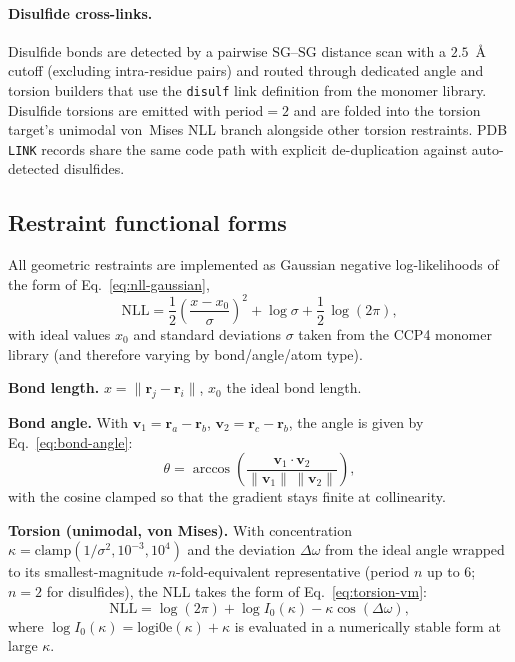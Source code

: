 \documentclass{iucrjournals}
\begin{document}
\paragraph{Disulfide cross-links.}
Disulfide bonds are detected by a pairwise $\mathrm{SG}\text{--}\mathrm{SG}$
distance scan with a $2.5$~\AA{} cutoff (excluding intra-residue pairs)
and routed through dedicated angle and torsion builders that use the
\texttt{disulf} link definition from the monomer library.  Disulfide
torsions are emitted with $\mathrm{period} = 2$ and are folded into the
torsion target's unimodal von~Mises NLL branch alongside other torsion
restraints.  PDB \texttt{LINK} records share the same code path with
explicit de-duplication against auto-detected disulfides.

\subsection{Restraint functional forms}

All geometric restraints are implemented as Gaussian negative log-likelihoods of
the form of Eq.~\ref{eq:nll-gaussian},
%
\begin{equation}
  \mathrm{NLL} = \frac{1}{2}\left(\frac{x - x_{0}}{\sigma}\right)^{2}
  + \log\sigma + \frac{1}{2}\,\log(2\pi),
  \label{eq:nll-gaussian}
\end{equation}
%
with ideal values $x_{0}$ and standard deviations $\sigma$ taken from the CCP4
monomer library (and therefore varying by bond/angle/atom type).

\textbf{Bond length.}
$x = \lVert\mathbf{r}_{j} - \mathbf{r}_{i}\rVert$, $x_{0}$ the ideal bond
length.

\textbf{Bond angle.} With $\mathbf{v}_{1} = \mathbf{r}_{a} - \mathbf{r}_{b}$,
$\mathbf{v}_{2} = \mathbf{r}_{c} - \mathbf{r}_{b}$, the angle is given by
Eq.~\ref{eq:bond-angle}:
%
\begin{equation}
  \theta = \arccos\!\left(
  \frac{\mathbf{v}_{1}\cdot\mathbf{v}_{2}}
  {\lVert\mathbf{v}_{1}\rVert\,\lVert\mathbf{v}_{2}\rVert}\right),
  \label{eq:bond-angle}
\end{equation}
%
with the cosine clamped so that the gradient stays finite at collinearity.

\textbf{Torsion (unimodal, von Mises).} With concentration
$\kappa = \mathrm{clamp}(1/\sigma^{2},10^{-3},10^{4})$ and the deviation
$\Delta\omega$ from the ideal angle wrapped to its smallest-magnitude
$n$-fold-equivalent representative (period $n$ up to $6$; $n = 2$ for
disulfides), the NLL takes the form of Eq.~\ref{eq:torsion-vm}:
%
\begin{equation}
  \mathrm{NLL} = \log(2\pi) + \log I_{0}(\kappa) - \kappa\cos(\Delta\omega),
  \label{eq:torsion-vm}
\end{equation}
%
where $\log I_{0}(\kappa) = \mathrm{logi0e}(\kappa) + \kappa$ is evaluated
in a numerically stable form at large $\kappa$.
\end{document}
